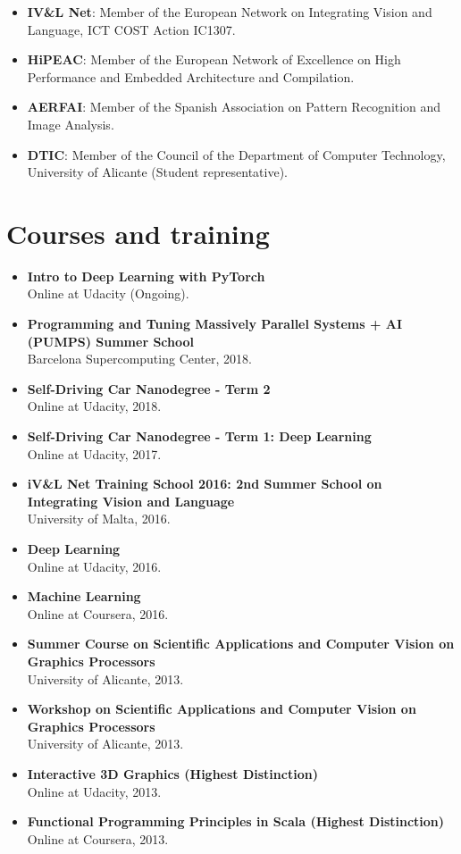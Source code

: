\documentclass[8pt]{article}
\begin{document}
\begin{itemize}
	\item \textbf{IV\&L Net}: Member of the European Network on Integrating Vision and Language, ICT COST Action IC1307.
	\item \textbf{HiPEAC}: Member of the European Network of Excellence on High Performance and Embedded Architecture and Compilation.
	\item \textbf{AERFAI}: Member of the Spanish Association on Pattern Recognition and Image Analysis.
	\item \textbf{DTIC}: Member of the Council of the Department of Computer Technology, University of Alicante (Student representative).
\end{itemize}

\section*{Courses and training}

\begin{itemize}
    \item \textbf{Intro to Deep Learning with PyTorch}\\ Online at Udacity (Ongoing).
	\item \textbf{Programming and Tuning Massively Parallel Systems + AI (PUMPS) Summer School}\\ Barcelona Supercomputing Center, 2018.
	\item \textbf{Self-Driving Car Nanodegree - Term 2}\\ Online at Udacity, 2018.
	\item \textbf{Self-Driving Car Nanodegree - Term 1: Deep Learning}\\ Online at Udacity, 2017.
	\item \textbf{iV\&L Net Training School 2016: 2nd Summer School on Integrating Vision and Language}\\ University of Malta, 2016.
	\item \textbf{Deep Learning}\\ Online at Udacity, 2016.
	\item \textbf{Machine Learning}\\ Online at Coursera, 2016.
	\item \textbf{Summer Course on Scientific Applications and Computer Vision on Graphics Processors}\\ University of Alicante, 2013.
	\item \textbf{Workshop on Scientific Applications and Computer Vision on Graphics Processors}\\ University of Alicante, 2013.	
	\item \textbf{Interactive 3D Graphics (Highest Distinction)}\\
	Online at Udacity, 2013.
	\item \textbf{Functional Programming Principles in Scala (Highest Distinction)}\\
	Online at Coursera, 2013.
\end{itemize}
\end{document}
